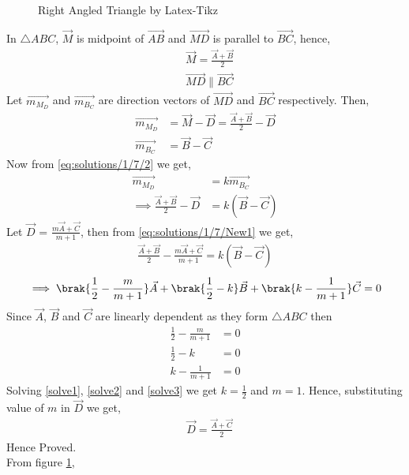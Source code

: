 \begin{figure}[!h]
\centering
\resizebox{\columnwidth}{!}{}
\caption{Right Angled Triangle by Latex-Tikz}
\label{myfig:solutions/1/7/}
\end{figure}
In $\triangle{ABC}$, $\vec{M}$ is midpoint of $\vec{AB}$ and $\vec{MD}$ is parallel to $\vec{BC}$, hence,
\begin{align}
&\vec{M} = \frac{\vec{A}+\vec{B}}{2}\label{eq:solutions/1/7/1}\\
&\vec{MD} \parallel \vec{BC}\label{eq:solutions/1/7/2}
\end{align}
Let $\vec{m_M_D}$ and $\vec{m_B_C}$ are direction vectors of $\vec{MD}$ and $\vec{BC}$ respectively. Then,
\begin{align}
\vec{m_M_D} &= \vec{M} - \vec{D} = \frac{\vec{A}+\vec{B}}{2} - \vec{D}\\
\vec{m_B_C} &= \vec{B} - \vec{C}
\end{align}
Now from \eqref{eq:solutions/1/7/2} we get,
\begin{align}
\vec{m_M_D} &= k\vec{m_B_C}\\
\implies\frac{\vec{A}+\vec{B}}{2} - \vec{D} &= k(\vec{B} - \vec{C})\label{eq:solutions/1/7/New1}
\end{align}
Let $\vec{D}$ = $\frac{m\vec{A}+\vec{C}}{m+1}$, then from \eqref{eq:solutions/1/7/New1} we get,
\begin{align}
\frac{\vec{A}+\vec{B}}{2} - \frac{m\vec{A}+\vec{C}}{m+1} = k(\vec{B} - \vec{C})
\end{align}
\begin{align}
\implies\brak{\frac{1}{2}-\frac{m}{m+1}}\vec{A}+\brak{\frac{1}{2}-k}\vec{B}+\brak{k-\frac{1}{m+1}}\vec{C} =0
\end{align}
Since $\vec{A}$, $\vec{B}$ and $\vec{C}$ are linearly dependent as they form $\triangle{ABC}$ then 
\begin{align}
\frac{1}{2}-\frac{m}{m+1} &= 0\label{solve1}\\
\frac{1}{2}-k & = 0\label{solve2}\\
k-\frac{1}{m+1} &= 0\label{solve3}
\end{align}
Solving \eqref{solve1}, \eqref{solve2} and \eqref{solve3} we get $k=\frac{1}{2}$ and $m = 1$. Hence, substituting value of $m$ in $\vec{D}$ we get,
\begin{align}
&\vec{D} = \frac{\vec{A}+\vec{C}}{2}\label{eq:solutions/1/7/3}
\end{align}
Hence Proved.\\
From figure \ref{myfig:solutions/1/7/},
